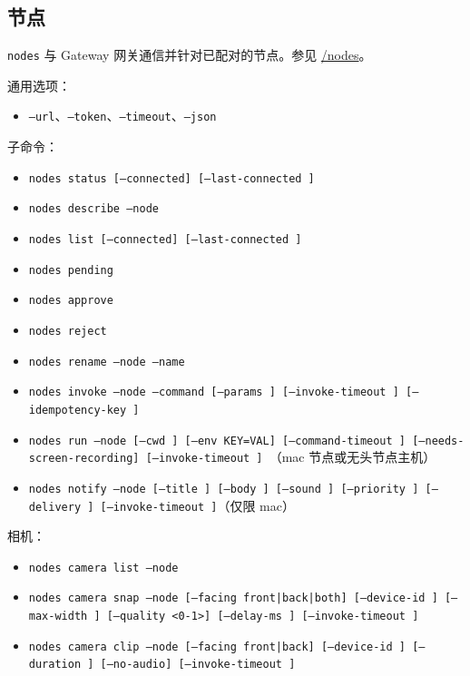 \subsection{节点}


\texttt{nodes} 与 Gateway 网关通信并针对已配对的节点。参见 \href{/nodes}{/nodes}。

通用选项：

\begin{itemize}
  \item \texttt{--url}、\texttt{--token}、\texttt{--timeout}、\texttt{--json}
\end{itemize}


子命令：

\begin{itemize}
  \item \texttt{nodes status [--connected] [--last-connected ]}
  \item \texttt{nodes describe --node }
  \item \texttt{nodes list [--connected] [--last-connected ]}
  \item \texttt{nodes pending}
  \item \texttt{nodes approve }
  \item \texttt{nodes reject }
  \item \texttt{nodes rename --node  --name }
  \item \texttt{nodes invoke --node  --command  [--params ] [--invoke-timeout ] [--idempotency-key ]}
  \item \texttt{nodes run --node  [--cwd ] [--env KEY=VAL] [--command-timeout ] [--needs-screen-recording] [--invoke-timeout ] }（mac 节点或无头节点主机）
  \item \texttt{nodes notify --node  [--title ] [--body ] [--sound ] [--priority ] [--delivery ] [--invoke-timeout ]}（仅限 mac）
\end{itemize}


相机：

\begin{itemize}
  \item \texttt{nodes camera list --node }
  \item \texttt{nodes camera snap --node  [--facing front|back|both] [--device-id ] [--max-width ] [--quality <0-1>] [--delay-ms ] [--invoke-timeout ]}
  \item \texttt{nodes camera clip --node  [--facing front|back] [--device-id ] [--duration ] [--no-audio] [--invoke-timeout ]}
\end{itemize}


